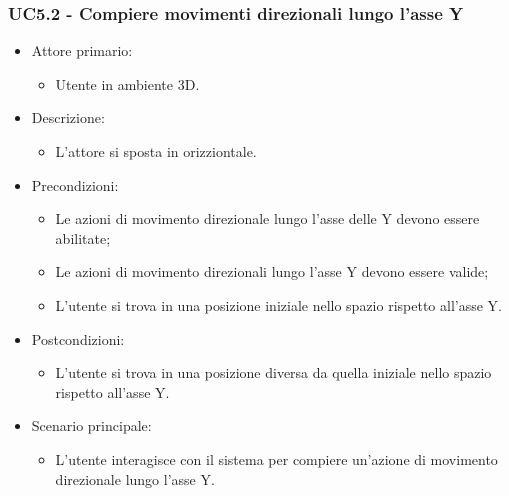 \subsubsection{UC5.2 - Compiere movimenti direzionali lungo l'asse Y}
\begin{itemize}

	\item Attore primario: 
	\begin{itemize}
		\item Utente in ambiente 3D.
	\end{itemize}
	\item Descrizione:
	\begin{itemize}
		\item L'attore si sposta in orizziontale.
	\end{itemize}
	
	\item Precondizioni:
	\begin{itemize}
		\item Le azioni di movimento direzionale lungo l'asse delle Y devono essere abilitate;
		\item Le azioni di movimento direzionali lungo l'asse Y devono essere valide;
		\item L'utente si trova in una posizione iniziale nello spazio rispetto all'asse Y.
	\end{itemize}
	
	\item Postcondizioni:
	\begin{itemize}
		\item L'utente si trova in una posizione diversa da quella iniziale nello spazio rispetto all'asse Y.
	\end{itemize}
	
	\item Scenario principale:
	\begin{itemize}
		\item L'utente interagisce con il sistema per compiere un'azione di movimento direzionale lungo l'asse Y.
	\end{itemize}
	
\end{itemize}


